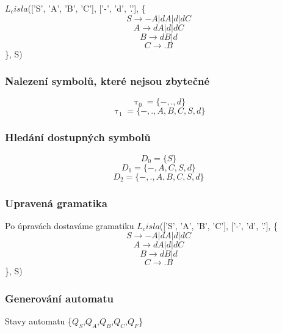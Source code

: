 $L_cisla$(['S', 'A', 'B', 'C'], ['-', 'd', '.'], \{
$$S \rightarrow -A|dA|d|dC$$$$A \rightarrow dA|d|dC$$$$B \rightarrow dB|d$$$$C \rightarrow .B$$\},
S)

\subsubsection{Nalezení symbolů, které nejsou zbytečné}$$\uptau_0 = \{-,.,d\}$$$$\uptau_1 = \{-,.,A,B,C,S,d\}$$\subsubsection{Hledání dostupných symbolů}$$D_0 = \{S\}$$$$D_1 = \{-,A,C,S,d\}$$$$D_2 = \{-,.,A,B,C,S,d\}$$\subsubsection{Upravená gramatika}
Po úpravách dostaváme gramatiku
$L_cisla$(['S', 'A', 'B', 'C'], ['-', 'd', '.'], \{
$$S \rightarrow -A|dA|d|dC$$$$A \rightarrow dA|d|dC$$$$B \rightarrow dB|d$$$$C \rightarrow .B$$\},
S)

\subsubsection{Generování automatu}
Stavy automatu \{$Q_{S}$,$Q_{A}$,$Q_{B}$,$Q_{C}$,$Q_{F}$\}
